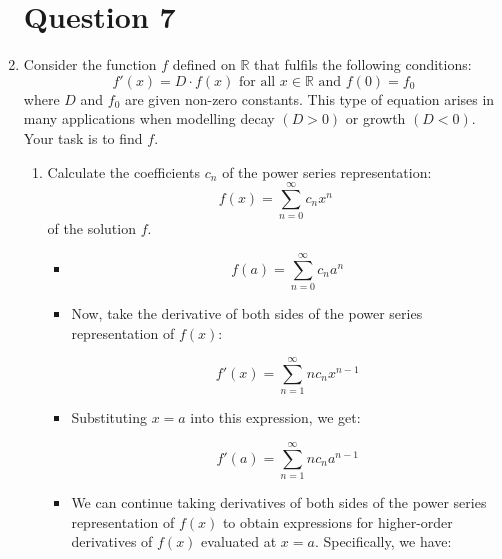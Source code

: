 \documentclass[12pt]{article}
\begin{document}
\begin{enumerate}[leftmargin=\labelsep]
    \newpage

    \section*{Question 7}
    
    \item Consider the function $f$ defined on $\mathbb{R}$ that fulfils the following conditions:
    \begin{equation*}
        f'(x) = D \cdot f(x) \text{ for all } x \in \mathbb{R} \text{ and } f(0) = f_0
    \end{equation*}
    where $D$ and $f_0$ are given non-zero constants. This type of equation arises in many applications when modelling decay $(D>0)$ or growth $(D<0)$. Your task is to find $f$.
    
    
    \begin{enumerate}
        \item Calculate the coefficients $c_n$ of the power series representation:
        \begin{equation*}
            f(x) = \sum_{n=0}^{\infty} c_n x^n
        \end{equation*}
        of the solution $f$.
        \begin{itemize}[label={}]
            \item \begin{equation*}
            f(a) = \sum_{n=0}^{\infty} c_n a^n
            \end{equation*}

            \item Now, take the derivative of both sides of the power series representation of $f(x)$:

            \begin{equation*}
            f'(x) = \sum_{n=1}^{\infty} n c_n x^{n-1}
            \end{equation*}

            \item Substituting $x=a$ into this expression, we get:

            \begin{equation*}
            f'(a) = \sum_{n=1}^{\infty} n c_n a^{n-1}
            \end{equation*}

            \item We can continue taking derivatives of both sides of the power series representation of $f(x)$ to obtain expressions for higher-order derivatives of $f(x)$ evaluated at $x=a$. Specifically, we have:


\end{itemize}
\end{enumerate}
\end{enumerate}
\end{document}
